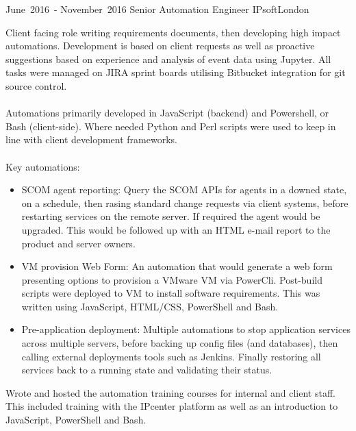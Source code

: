 \cventry %
  {\mbox{June 2016 -} \mbox{November 2016}}
  {Senior Automation Engineer}
  {IPsoft}{London}{}
  {
    Client facing role writing requirements documents, then developing high impact automations. 
    Development is based on client requests as well as proactive suggestions based on experience 
    and analysis of event data using Jupyter.  All tasks were managed on JIRA sprint boards utilising 
    Bitbucket integration for git source control.\\~\\
    Automations primarily developed in JavaScript (backend) and Powershell, or Bash (client-side). 
    Where needed Python and Perl scripts were used to keep in line with client development frameworks.\\~\\
    Key automations:\\
    \begin{itemize}
      \item SCOM agent reporting: Query the SCOM APIs for agents in a downed state, on a schedule, 
            then rasing standard change requests via client systems, before restarting services on 
            the remote server. If required the agent would be upgraded. This would be followed up 
            with an HTML e-mail report to the product and server owners.\\ 
      \item VM provision Web Form: An automation that would generate a web form presenting options 
            to provision a VMware VM via PowerCli. Post-build scripts were deployed to VM to install 
            software requirements. This was written using JavaScript, HTML/CSS, PowerShell and Bash.\\
      \item Pre-application deployment: Multiple automations to stop application services across 
            multiple servers, before backing up config files (and databases), then calling external 
            deployments tools such as Jenkins. Finally restoring all services back to a running 
            state and validating their status.\\
    \end{itemize}
    Wrote and hosted the automation training courses for internal and client staff. This included 
    training with the IPcenter platform as well as an introduction to JavaScript, PowerShell and Bash.\\
  }

